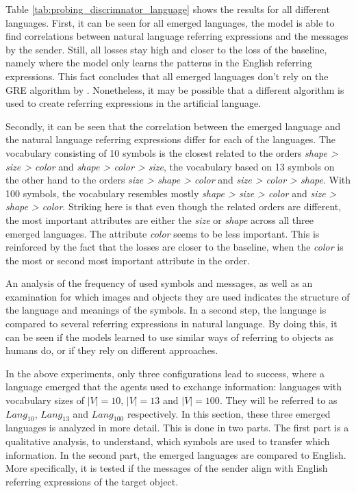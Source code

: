 Table \ref{tab:probing_discrimnator_language} shows the results for all different languages.
First, it can be seen for all emerged languages, the model is able to find correlations between natural language referring expressions and the messages by the sender.
Still, all losses stay high and closer to the loss of the baseline, namely where the model only learns the patterns in the English referring expressions.
This fact concludes that all emerged languages don't rely on the GRE algorithm by \citet{Dale1995}.
Nonetheless, it may be possible that a different algorithm is used to create referring expressions in the artificial language.

Secondly, it can be seen that the correlation between the emerged language and the natural language referring expressions differ for each of the languages.
The vocabulary consisting of 10 symbols is the closest related to the orders \emph{shape > size > color} and \emph{shape > color > size}, the vocabulary based on 13 symbols on the other hand to the orders \emph{size > shape > color} and \emph{size > color > shape}.
With 100 symbols, the vocabulary resembles mostly \emph{shape > size > color} and \emph{size > shape > color}.
Striking here is that even though the related orders are different, the most important attributes are either the \emph{size} or \emph{shape} across all three emerged languages.
The attribute \emph{color} seems to be less important.
This is reinforced by the fact that the losses are closer to the baseline, when the \emph{color} is the most or second most important attribute in the order.

An analysis of the frequency of used symbols and messages, as well as an examination for which images and objects they are used indicates the structure of the language and meanings of the symbols.
In a second step, the language is compared to several referring expressions in natural language.
By doing this, it can be seen if the models learned to use similar ways of referring to objects as humans do, or if they rely on different approaches.


In the above experiments, only three configurations lead to success, where a language emerged that the agents used to exchange information: languages with vocabulary sizes of $|V| = 10$, $|V| = 13$ and $|V| = 100$.
They will be referred to as $Lang_{10}$, $Lang_{13}$ and $Lang_{100}$ respectively.
In this section, these three emerged languages is analyzed in more detail.
This is done in two parts.
The first part is a qualitative analysis, to understand, which symbols are used to transfer which information.
In the second part, the emerged languages are compared to English.
More specifically, it is tested if the messages of the sender align with English referring expressions of the target object.

